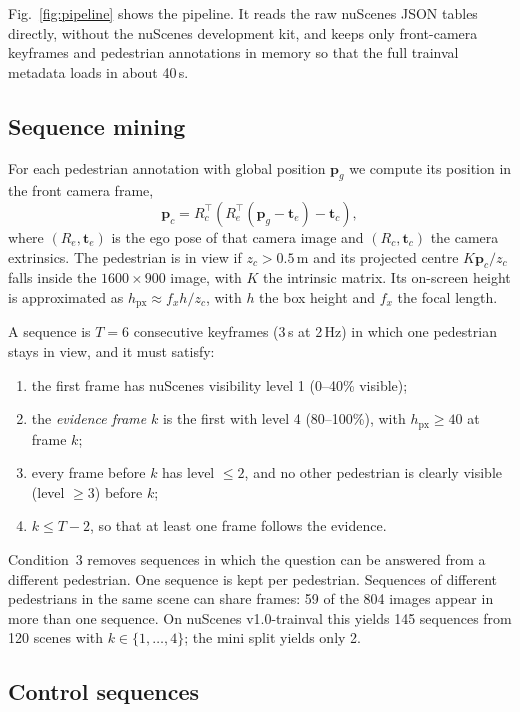 \documentclass[conference]{IEEEtran}
\begin{document}
Fig.~\ref{fig:pipeline} shows the pipeline. It reads the raw nuScenes JSON tables directly, without the nuScenes development kit, and keeps only front-camera keyframes and pedestrian annotations in memory so that the full trainval metadata loads in about 40\,s.

\subsection{Sequence mining}

For each pedestrian annotation with global position $\mathbf{p}_g$ we compute its position in the front camera frame,
\begin{equation}
\mathbf{p}_c = R_c^{\top}\!\left(R_e^{\top}(\mathbf{p}_g - \mathbf{t}_e) - \mathbf{t}_c\right),
\end{equation}
where $(R_e, \mathbf{t}_e)$ is the ego pose of that camera image and $(R_c, \mathbf{t}_c)$ the camera extrinsics. The pedestrian is in view if $z_c > 0.5$\,m and its projected centre $K\mathbf{p}_c / z_c$ falls inside the $1600\times900$ image, with $K$ the intrinsic matrix. Its on-screen height is approximated as $h_{\text{px}} \approx f_x h / z_c$, with $h$ the box height and $f_x$ the focal length.

A sequence is $T=6$ consecutive keyframes (3\,s at 2\,Hz) in which one pedestrian stays in view, and it must satisfy:
\begin{enumerate}
  \item the first frame has nuScenes visibility level 1 (0--40\% visible);
  \item the \emph{evidence frame} $k$ is the first with level 4 (80--100\%), with $h_{\text{px}} \ge 40$ at frame $k$;
  \item every frame before $k$ has level $\le 2$, and no other pedestrian is clearly visible (level $\ge 3$) before $k$;
  \item $k \le T-2$, so that at least one frame follows the evidence.
\end{enumerate}
Condition~3 removes sequences in which the question can be answered from a different pedestrian. One sequence is kept per pedestrian. Sequences of different pedestrians in the same scene can share frames: 59 of the 804 images appear in more than one sequence. On nuScenes v1.0-trainval this yields 145 sequences from 120 scenes with $k \in \{1,\dots,4\}$; the mini split yields only 2.

\subsection{Control sequences}
\end{document}
